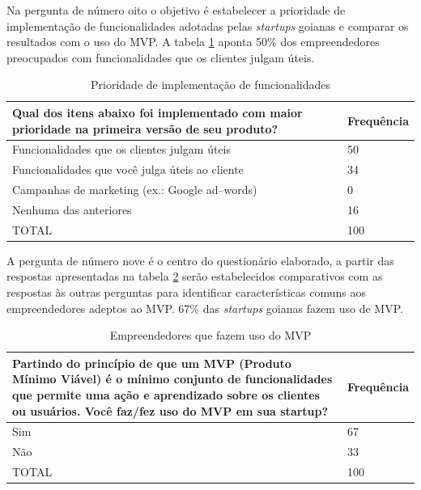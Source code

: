 \pagebreak

Na pergunta de n\'umero oito o objetivo \'e estabelecer a prioridade de implementa\c{c}\~ao de funcionalidades adotadas pelas \emph{startups} goianas e comparar os resultados com o uso do MVP. A tabela \ref{tab:pergunta8} aponta 50\% dos empreendedores preocupados com funcionalidades que os clientes julgam \'uteis.

\begin{table}[hb]
\centering
\caption{Prioridade de implementa\c{c}\~ao de funcionalidades}
\label{tab:pergunta8}
\begin{tabular}{|p{10cm}|p{2cm}|}
\hline{\bf Qual dos itens abaixo foi implementado com maior prioridade na primeira vers\~ao de seu produto?} & {\bf Frequ\^encia}\\
\hline Funcionalidades que os clientes julgam \'uteis & 50\\
\hline Funcionalidades que voc\^e julga \'uteis ao cliente & 34\\
\hline Campanhas de marketing (ex.: Google ad--words) & 0\\
\hline Nenhuma das anteriores & 16\\
\hline TOTAL & 100\\
\hline
\end{tabular}
\end{table}

A pergunta de n\'umero nove \'e o centro do question\'ario elaborado, a partir das respostas apresentadas na tabela \ref{tab:cap4per9} ser\~ao estabelecidos comparativos com as respostas \`as outras perguntas para identificar caracter\'isticas comuns aos empreendedores adeptos ao MVP. 67\% das \emph{startups} goianas fazem uso de MVP.

\begin{table}[hb]
\centering
\caption{Empreendedores que fazem uso do MVP}
\label{tab:cap4per9}
\begin{tabular}{|p{10cm}|p{2cm}|}
\hline{\bf Partindo do princ\'ipio de que um MVP (Produto M\'inimo Vi\'avel) \'e o m\'inimo conjunto de funcionalidades que permite uma a\c{c}\~ao e aprendizado sobre os clientes ou usu\'arios. Voc\^e faz/fez uso do MVP  em sua startup?} & {\bf Frequ\^encia}\\
\hline Sim & 67\\
\hline N\~ao & 33\\
\hline TOTAL & 100\\
\hline
\end{tabular}
\end{table}

